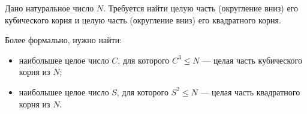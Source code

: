 Дано натуральное число $N$. Требуется найти целую часть (округление вниз) его кубического корня и целую часть (округление вниз) его квадратного корня.

Более формально, нужно найти:

\begin{itemize}
\item наибольшее целое число $C$, для которого $C^3 \le N$ --- целая часть кубического корня из $N$;
\item наибольшее целое число $S$, для которого $S^2 \le N$ --- целая часть квадратного корня из $N$.
\end{itemize}

